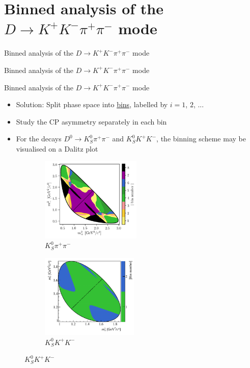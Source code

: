 \documentclass{beamer}
\begin{document}
\section{Binned analysis of the \texorpdfstring{$D\to K^+K^-\pi^+\pi^-$}{D2KKpipi} mode}
\begin{frame}{Binned analysis of the $D\to K^+K^-\pi^+\pi^-$ mode}
  \begin{center}
    {\huge Binned analysis of the $D\to K^+K^-\pi^+\pi^-$ mode}
  \end{center}
\end{frame}

\begin{frame}{Binned analysis of the $D\to K^+K^-\pi^+\pi^-$ mode}
  \begin{itemize}
    \setlength\itemsep{1.0em}
    \item{Solution: Split phase space into \underline{bins}, labelled by $i = 1$, $2$, ...}
    \item{Study the CP asymmetry separately in each bin}
    \item{For the decays $D^0\to K_S^0\pi^+\pi^-$ and $K_S^0K^+K^-$, the binning scheme may be visualised on a Dalitz plot}
  \end{itemize}
  \begin{figure}
    \begin{subfigure}{0.45\textwidth}
      \includegraphics[height = 4cm]{Plots/KsPiPi_optimal.png}
      \caption*{$K_S^0\pi^+\pi^-$}
    \end{subfigure}%
    \begin{subfigure}{0.45\textwidth}
      \includegraphics[height = 4cm]{Plots/KsKK_binning.png}
      \caption*{$K_S^0K^+K^-$}
    \end{subfigure}
  \end{figure}
\end{frame}
\end{document}

